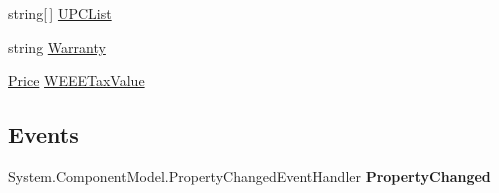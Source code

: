 \begin{DoxyCompactItemize}
\begin{DoxyCompactList}\small\item\em \end{DoxyCompactList}\item 
\hypertarget{class_amazon___price___finder_1_1amazon_1_1ecs_1_1_item_attributes_a1e866e5fdf7cff50a42cb04d7c813246}{string\mbox{[}$\,$\mbox{]} \hyperlink{class_amazon___price___finder_1_1amazon_1_1ecs_1_1_item_attributes_a1e866e5fdf7cff50a42cb04d7c813246}{U\-P\-C\-List}}\label{class_amazon___price___finder_1_1amazon_1_1ecs_1_1_item_attributes_a1e866e5fdf7cff50a42cb04d7c813246}

\begin{DoxyCompactList}\small\item\em \end{DoxyCompactList}\item 
\hypertarget{class_amazon___price___finder_1_1amazon_1_1ecs_1_1_item_attributes_a2e20d437d21a081f0a54a13925ff6cea}{string \hyperlink{class_amazon___price___finder_1_1amazon_1_1ecs_1_1_item_attributes_a2e20d437d21a081f0a54a13925ff6cea}{Warranty}}\label{class_amazon___price___finder_1_1amazon_1_1ecs_1_1_item_attributes_a2e20d437d21a081f0a54a13925ff6cea}

\begin{DoxyCompactList}\small\item\em \end{DoxyCompactList}\item 
\hypertarget{class_amazon___price___finder_1_1amazon_1_1ecs_1_1_item_attributes_a6d26e308cca65428bd7637462aca3556}{\hyperlink{class_amazon___price___finder_1_1amazon_1_1ecs_1_1_price}{Price} \hyperlink{class_amazon___price___finder_1_1amazon_1_1ecs_1_1_item_attributes_a6d26e308cca65428bd7637462aca3556}{W\-E\-E\-E\-Tax\-Value}}\label{class_amazon___price___finder_1_1amazon_1_1ecs_1_1_item_attributes_a6d26e308cca65428bd7637462aca3556}

\begin{DoxyCompactList}\small\item\em \end{DoxyCompactList}\end{DoxyCompactItemize}
\subsection*{Events}
\begin{DoxyCompactItemize}
\item 
\hypertarget{class_amazon___price___finder_1_1amazon_1_1ecs_1_1_item_attributes_a77631d2004a2073b2c440b85a1af1836}{System.\-Component\-Model.\-Property\-Changed\-Event\-Handler {\bfseries Property\-Changed}}\label{class_amazon___price___finder_1_1amazon_1_1ecs_1_1_item_attributes_a77631d2004a2073b2c440b85a1af1836}

\end{DoxyCompactItemize}


